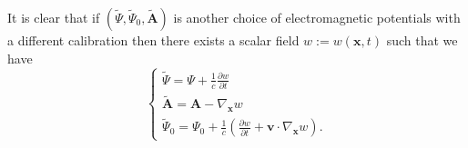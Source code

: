\documentclass{article}
\theoremstyle{definition}
\theoremstyle{remark}
\renewcommand{\vec}[1]{\mathbf{#1}}
\begin{document}
%
%
%
It is clear that if $(\tilde\Psi,\tilde\Psi_0,\tilde{\vec A})$ is
another choice of electromagnetic potentials with a different
calibration then there exists a scalar field $w:=w(\vec x,t)$ such
that we have
\begin{equation}\label{MaxVacFull1bjkgjhjhgjgjgkjfhjfdghghligioiuittrPPNhjkjhkjgghhjjhj}
\begin{cases}
\tilde\Psi=\Psi+\frac{1}{c}\frac{\partial w}{\partial t}\\
\tilde{\vec A}=\vec A-\nabla_{\vec x}w\\
\tilde\Psi_0=\Psi_0+\frac{1}{c}\left(\frac{\partial w}{\partial
t}+\vec v\cdot\nabla_{\vec x}w\right).
\end{cases}
\end{equation}
\end{document}
